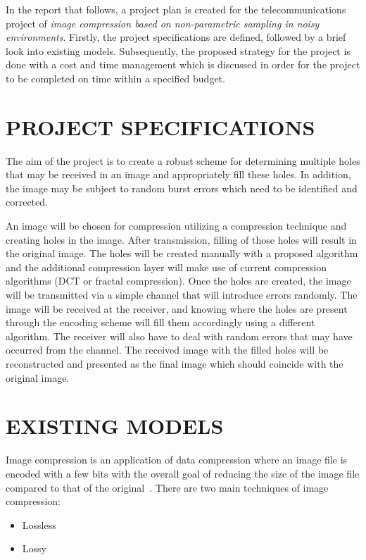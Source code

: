 \documentclass[10pt,twocolumn, a4paper]{witseiepaper}
\begin{document}
In the report that follows, a project plan is created for the telecommunications project of \emph{image compression based on non-parametric sampling in noisy environments}. Firstly, the project specifications are defined, followed by a brief look into existing models. Subsequently, the proposed strategy for the project is done with a cost and time management which is discussed in order for the project to be completed on time within a specified budget.

%
\section{PROJECT SPECIFICATIONS}
\label{sec: Project Specs}
The aim of the project is to create a robust scheme for determining multiple holes that may be received in an image and appropriately fill these holes. In addition, the image may be subject to random burst errors which need to be identified and corrected.

An image will be chosen for compression utilizing a compression technique and creating holes in the image. After transmission, filling of those holes will result in the original image. The holes will be created manually with a proposed algorithm and the additional compression layer will make use of current compression algorithms (DCT or fractal compression). Once the holes are created, the image will be transmitted via a simple channel that will introduce errors randomly. The image will be received at the receiver, and knowing where the holes are present through the encoding scheme will fill them accordingly using a different algorithm. The receiver will also have to deal with random errors that may have occurred from the channel. The received image with the filled holes will be reconstructed and presented as the final image which should coincide with the original image.

%
\section{EXISTING MODELS}
\label{sec: Existing Models}
Image compression is an application of data compression where an image file is encoded with a few bits with the overall goal of reducing the size of the image file compared to that of the original~\cite{ImageComp}. There are two main techniques of image compression:
\begin{itemize}
\item Lossless
\item Lossy
\end{itemize}
\end{document}
